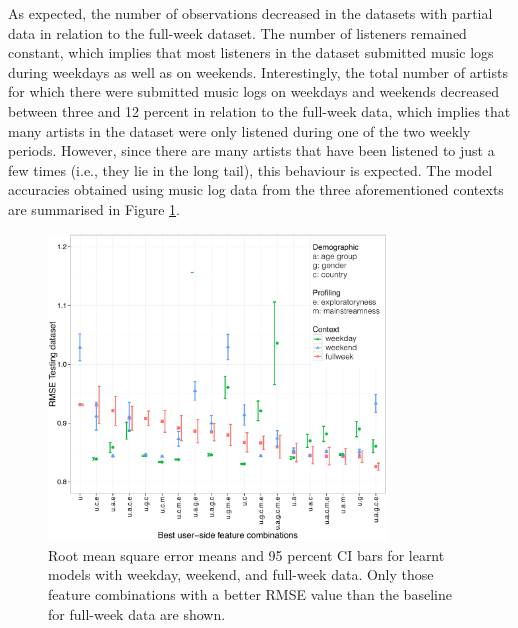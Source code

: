 As expected, the number of observations decreased in the datasets with partial data in relation to the full-week dataset. The number of listeners remained constant, which implies that most listeners in  the dataset submitted music logs during weekdays as well as on weekends.  Interestingly, the total number of artists for which there were submitted music logs on weekdays and weekends decreased between three and 12 percent in relation to the full-week data, which implies that many artists in the dataset were only listened during one of the two weekly periods. 
However, since there are many artists that have been listened to just a few times (i.e., they lie in the long tail), this behaviour is expected.
The model accuracies obtained using music log data from the three aforementioned contexts are summarised in Figure \ref{fig:5_context_comparison_result}. 

\begin{figure}[!h]
	\centering
	\includegraphics[width = 0.8\textwidth]{figs/ch8/best_features_dow_3_n_5_boostrap_100-1_legend_cropped.pdf}
 	\caption[Root mean square error means for learnt models with weekday, weekend, and full-week data]{Root mean square error means and 95 percent CI bars for learnt models with weekday, weekend, and full-week data. Only those feature combinations with a better RMSE value than the baseline for full-week data are shown.}
 	\label{fig:5_context_comparison_result}
\end{figure}


